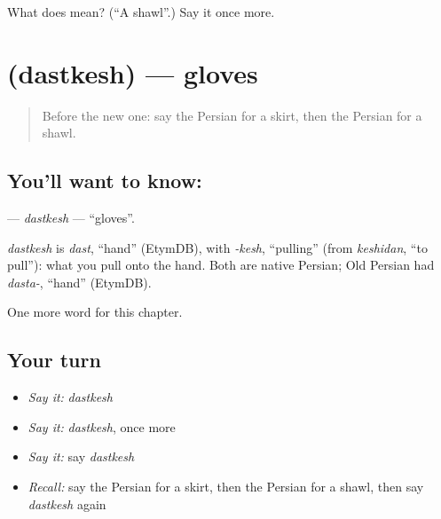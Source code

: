 \begin{tcolorbox}[breakable,colback=teal!4,colframe=teal!35!black,title={Before you move on}]
What does  mean? (\textquotedblleft{}A shawl\textquotedblright{}.) Say it once more.
\end{tcolorbox}
\section[\texorpdfstring{\fa{دستکش} (dastkesh)}{دستکش (dastkesh)}]{ (dastkesh) — gloves}

\label{lesson:FA-C97-dastkesh}



\begin{quote}
Before the new one: say the Persian for a skirt, then the Persian for a shawl.
\end{quote}

\subsection*{You'll want to know: }
\textbf{} — \emph{dastkesh} — \textquotedblleft{}gloves\textquotedblright{}.

\begin{cousinweb}
\emph{dastkesh} is \emph{dast}, \textquotedblleft{}hand\textquotedblright{} (EtymDB), with \emph{-kesh}, \textquotedblleft{}pulling\textquotedblright{} (from \emph{keshidan}, \textquotedblleft{}to pull\textquotedblright{}): what you pull onto the hand. Both are native Persian; Old Persian had \emph{dasta-}, \textquotedblleft{}hand\textquotedblright{} (EtymDB).
\end{cousinweb}

\begin{grammarlens}[title={What you've built}]
One more word for this chapter.
\end{grammarlens}

\subsection*{Your turn}
\begin{itemize}
\raggedright
  \item \emph{Say it:} \emph{dastkesh}
  \item \emph{Say it:} \emph{dastkesh}, once more
  \item \emph{Say it:} say \emph{dastkesh}
  \item \emph{Recall:} say the Persian for a skirt, then the Persian for a shawl, then say \emph{dastkesh} again
\end{itemize}

